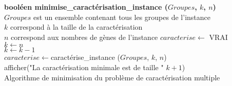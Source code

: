 \documentclass[a4paper,10pt]{article}
\begin{document}
\begin{algorithm}[!h]
	\textbf{booléen minimise\_caractérisation\_instance ($Groupes$, $k$, $n$)}\\
	\tcp
	{
		$Groupes$ est un ensemble contenant tous les groupes de l'instance\\
		$k$ correspond à la taille de la caractérisation\\
		$n$ correspond aux nombres de gènes de l'instance
	}
	$caracterise \leftarrow$ VRAI\\
	$k \leftarrow n$\\
	{
		$k \leftarrow k-1$\\
		$caracterise \leftarrow $caractérise\_instance ($Groupes$, $k$, $n$)\\
	}
	afficher("La caractérisation minimale est de taille " $k+1$)\\
	\caption{Algorithme de minimisation du problème de caractérisation multiple}
\end{algorithm}
\end{document}
